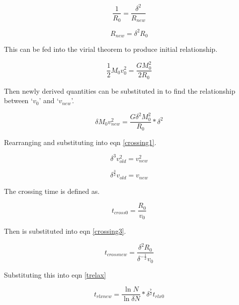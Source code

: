 \documentclass[%
 aip,
 jmp,%
 amsmath,amssymb,
 reprint,%
]{revtex4-1}
\begin{document}
\begin{equation}
  \frac{1}{R_{0}}=\frac{\delta^{2}}{R_{new}}
\label{radius1}
\end{equation}

\begin{equation}
R_{new}=\delta^{2}R_{0}
\label{radius2}
\end{equation}

This can be fed into the virial theorem to produce initial relationship.

\begin{equation}
\frac{1}{2} M_{0} v_{0}^{2}=\frac{GM_{0}^{2}}{2R_{0}}
\label{crossing1}
\end{equation}
 
 Then newly derived quantities can be substituted in to find the relationship between `$v_{0}$' and `$v_{new}$'.
  
\begin{equation}
 \delta M_{0} v_{new}^{2}=\frac{G \delta^{2} M_{0}^{2}}{R_{0}}*\delta^{2}
\label{crossing2}
\end{equation}

Rearranging and substituting into eqn \eqref{crossing1}.

\begin{equation}
 \delta^{3} v_{old}^{2}=v_{new}^{2}
\label{crossing3}
\end{equation}

\begin{equation}
 \delta^{\frac{3}{2}} v_{old}=v_{new}
\label{crossing3}
\end{equation}

The crossing time is defined as.

\begin{equation}
 t_{cross0}=\frac{R_{0}}{v_{0}}
\label{crossing4}
\end{equation}

Then is substituted into eqn \eqref{crossing3}.

\begin{equation}
 t_{crossnew}=\frac{\delta^{2}R_{0}}{\delta^{-\frac{1}{2}}v_{0}}
\label{crossing5}
\end{equation}

Substituting this into eqn \eqref{trelax} 


\begin{equation}
  t_{rlxnew}= \frac{\ln N}{ \ln \delta N}* \delta^{\frac{7}{2}} t_{rlx0} \label{trelaxnew}
\end{equation}
\end{document}
